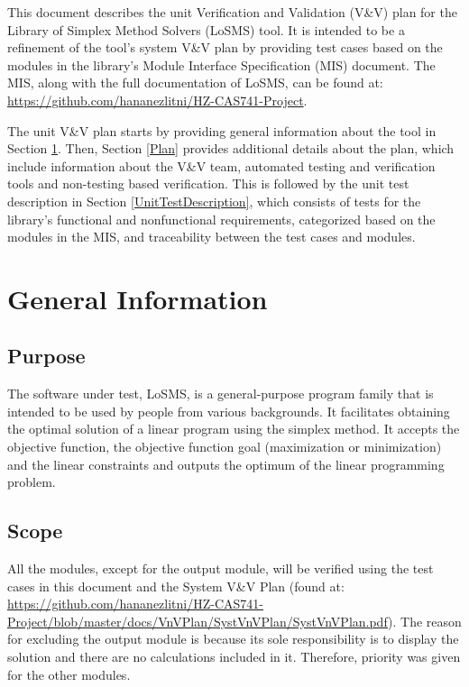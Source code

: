 \documentclass[12pt, titlepage]{article}
\newcommand{\famname}{LoSMS}
\begin{document}
This document describes the unit Verification and Validation (V\&V) plan for
the Library of Simplex Method Solvers (\famname{}) tool. It is intended to be a 
refinement of the tool's system V\&V plan by providing test cases based on 
the modules in the library's Module Interface Specification (MIS) document. The 
MIS, along with the full documentation of \famname{}, can be found at: 
\url{https://github.com/hananezlitni/HZ-CAS741-Project}.

The unit V\&V plan starts by providing general information about the tool in 
Section \ref{GeneralInfo}. Then, Section \ref{Plan} provides additional details 
about the plan, which include information about the V\&V team, automated 
testing and verification tools and non-testing based verification. This is 
followed by the unit test description in Section \ref{UnitTestDescription}, 
which consists of tests for the library's functional and nonfunctional 
requirements, categorized based on the modules in the MIS, and traceability 
between the test cases and modules.

\section{General Information} \label{GeneralInfo}

\subsection{Purpose}

The software under test, \famname{}, is a general-purpose program family that 
is intended to be used by people from various backgrounds. It facilitates 
obtaining the optimal solution of a linear program using the simplex method. It 
accepts the objective function, the objective function goal (maximization or 
minimization) and the linear constraints and outputs the optimum of the linear 
programming problem.

\subsection{Scope}

All the modules, except for the output module, will be verified using the test 
cases in this document and the System V\&V Plan (found at: 
\url{https://github.com/hananezlitni/HZ-CAS741-Project/blob/master/docs/VnVPlan/SystVnVPlan/SystVnVPlan.pdf}).
 The reason for excluding the output module is because its sole responsibility 
 is to display the solution and there are no calculations included in it. 
 Therefore, priority was given for the other modules.
\end{document}

